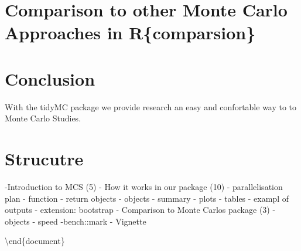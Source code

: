 \documentclass[10pt,a4paper]{article}
\begin{document}
 \hypertarget{comparison-to-other-monte-carlo-approaches-in-rcomparsion}{%
 \section{Comparison to other Monte Carlo Approaches in
 R\{comparsion\}}\label{comparison-to-other-monte-carlo-approaches-in-rcomparsion}}

 \hypertarget{conclusion}{%
 \section{Conclusion}\label{conclusion}}

 With the tidyMC package we provide research an easy and confortable way
 to to Monte Carlo Studies.

 \hypertarget{strucutre}{%
 \section{Strucutre}\label{strucutre}}

 -Introduction to MCS (5) - How it works in our package (10) -
 parallelisation plan - function - return objects - objects - summary -
 plots - tables - exampl of outputs - extension: bootstrap - Comparison
 to Monte Carlos package (3) - objects - speed -bench::mark - Vignette

 \textbackslash end\{document\}
			\renewcommand*{\mkbibnamefamily}[1]{\textbf{#1}}
	\renewcommand*{\mkbibnamegiven}[1]{\textbf{#1}}
	\renewcommand*{\mkbibnameprefix}[1]{\textbf{#1}}
	\renewcommand*{\mkbibnamesuffix}[1]{\textbf{#1}}
	\printbibliography[title=References]
		
\end{document}
